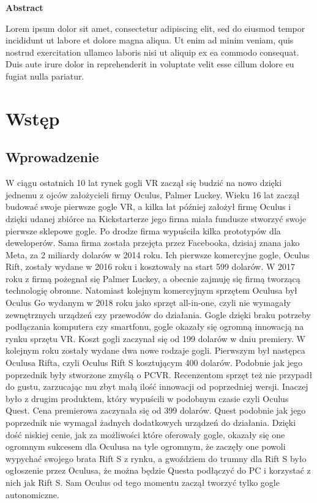 \documentclass[a4paper,12pt,reqno]{article}
\begin{document}
\newpage
\begin{flushleft}
\Large \textbf{Abstract}
\end{flushleft}
\vspace{1cm}


Lorem ipsum dolor sit amet, consectetur adipiscing elit, sed do eiusmod tempor incididunt ut labore et dolore magna aliqua. Ut enim ad minim veniam, quis nostrud exercitation ullamco laboris nisi ut aliquip ex ea commodo consequat. Duis aute irure dolor in reprehenderit in voluptate velit esse cillum dolore eu fugiat nulla pariatur.

\newpage

\section{Wstęp}

\subsection{Wprowadzenie}

W ciągu ostatnich 10 lat rynek gogli VR zaczął się budzić na nowo dzięki jednemu z ojców założycieli firmy Oculus, Palmer Luckey. Wieku 16 lat zaczął budować swoje pierwsze gogle VR, a kilka lat później założył firmę Oculus i dzięki udanej zbiórce na Kickstarterze jego firma miała fundusze stworzyć swoje pierwsze sklepowe gogle. Po drodze firma wypuściła kilka prototypów dla deweloperów. Sama firma została przejęta przez Facebooka, dzisiaj znana jako Meta, za 2 miliardy dolarów w 2014 roku. Ich pierwsze komercyjne gogle, Oculus Rift, zostały wydane w 2016 roku i kosztowały na start 599 dolarów. W 2017 roku z firmą pożegnał się Palmer Luckey, a obecnie zajmuję się firmą tworzącą technologię obronne. Natomiast kolejnym komercyjnym sprzętem Oculusa był Oculus Go wydanym w 2018 roku jako sprzęt all-in-one, czyli nie wymagały zewnętrznych urządzeń czy przewodów do działania. Gogle dzięki braku potrzeby podłączania komputera czy smartfonu, gogle okazały się ogromną innowacją na rynku sprzętu VR. Koszt gogli zaczynał się od 199 dolarów w dniu premiery. W kolejnym roku zostały wydane dwa nowe rodzaje gogli. Pierwszym był następca Oculusa Rifta, czyli Oculus Rift S kosztującym 400 dolarów. Podobnie jak jego poprzednik były stworzone zmyślą o PCVR. Recenzentom sprzęt też nie przypadł do gustu, zarzucając mu zbyt małą ilość innowacji od poprzedniej wersji. Inaczej było z drugim produktem, który wypuścili w podobnym czasie czyli Oculus Quest. Cena premierowa zaczynała się od 399 dolarów. Quest podobnie jak jego poprzednik nie wymagał żadnych dodatkowych urządzeń do działania. Dzięki dość niskiej cenie, jak za możliwości które oferowały gogle, okazały się one ogromnym sukcesem dla Oculusa na tyle ogromnym, że zaczęły one powoli wypychać swojego brata Rift S z rynku, a gwoździem do trumny dla Rift S było ogłoszenie przez Oculusa, że można będzie Questa podłączyć do PC i korzystać z nich jak Rift S. Sam Oculus od tego momentu zaczął tworzyć tylko gogle autonomiczne. 
\end{document}
